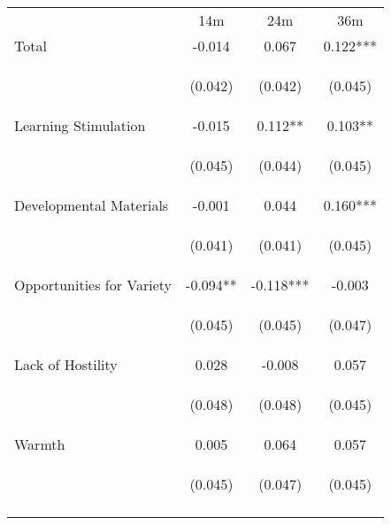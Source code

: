 \begin{tabular}{lccc}
\hline \noalign{\smallskip} & 14m & 24m & 36m\\
\noalign{\smallskip}\hline \noalign{\smallskip}Total & -0.014 & 0.067 & 0.122***\\
 & \begin{footnotesize}(0.042)\end{footnotesize} & \begin{footnotesize}(0.042)\end{footnotesize} & \begin{footnotesize}(0.045)\end{footnotesize}\\
\noalign{\smallskip}Learning Stimulation & -0.015 & 0.112** & 0.103**\\
 & \begin{footnotesize}(0.045)\end{footnotesize} & \begin{footnotesize}(0.044)\end{footnotesize} & \begin{footnotesize}(0.045)\end{footnotesize}\\
\noalign{\smallskip}Developmental Materials & -0.001 & 0.044 & 0.160***\\
 & \begin{footnotesize}(0.041)\end{footnotesize} & \begin{footnotesize}(0.041)\end{footnotesize} & \begin{footnotesize}(0.045)\end{footnotesize}\\
\noalign{\smallskip}Opportunities for Variety & -0.094** & -0.118*** & -0.003\\
 & \begin{footnotesize}(0.045)\end{footnotesize} & \begin{footnotesize}(0.045)\end{footnotesize} & \begin{footnotesize}(0.047)\end{footnotesize}\\
\noalign{\smallskip}Lack of Hostility & 0.028 & -0.008 & 0.057\\
 & \begin{footnotesize}(0.048)\end{footnotesize} & \begin{footnotesize}(0.048)\end{footnotesize} & \begin{footnotesize}(0.045)\end{footnotesize}\\
\noalign{\smallskip}Warmth & 0.005 & 0.064 & 0.057\\
 & \begin{footnotesize}(0.045)\end{footnotesize} & \begin{footnotesize}(0.047)\end{footnotesize} & \begin{footnotesize}(0.045)\end{footnotesize}\\
\noalign{\smallskip}\hline\end{tabular}\\
